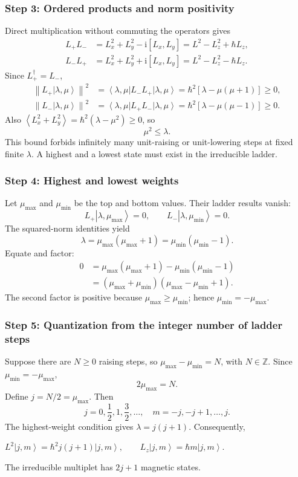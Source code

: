 \documentclass[11pt,a4paper]{article}
\newcommand{\key}[1]{\begin{resultbox}\centering\(\displaystyle #1\)\end{resultbox}}
\newcommand{\iu}{\mathrm{i}}
\newcommand{\avg}[1]{\left\langle #1\right\rangle}
\newcommand{\ket}[1]{\left|#1\right\rangle}
\newcommand{\bra}[1]{\left\langle #1\right|}
\newcommand{\norm}[1]{\left\lVert #1\right\rVert}
\begin{document}
\subsubsection*{Step 3: Ordered products and norm positivity}
Direct multiplication without commuting the operators gives
\begin{align}
L_+L_-&=L_x^2+L_y^2-\iu[L_x,L_y]=L^2-L_z^2+\hbar L_z,\\
L_-L_+&=L_x^2+L_y^2+\iu[L_x,L_y]=L^2-L_z^2-\hbar L_z.
\end{align}
Since \(L_+^\dagger=L_-\),
\begin{align}
\norm{L_+\ket{\lambda,\mu}}^2&=\bra{\lambda,\mu}L_-L_+\ket{\lambda,\mu}=\hbar^2[\lambda-\mu(\mu+1)]\ge0,\\
\norm{L_-\ket{\lambda,\mu}}^2&=\bra{\lambda,\mu}L_+L_-\ket{\lambda,\mu}=\hbar^2[\lambda-\mu(\mu-1)]\ge0.
\end{align}
Also \(\avg{L_x^2+L_y^2}=\hbar^2(\lambda-\mu^2)\ge0\), so
\begin{equation}\boxed{\mu^2\le\lambda.}\end{equation}
This bound forbids infinitely many unit-raising or unit-lowering steps at fixed finite \(\lambda\). A highest and a lowest state must exist in the irreducible ladder.

\subsubsection*{Step 4: Highest and lowest weights}
Let \(\mu_{\max}\) and \(\mu_{\min}\) be the top and bottom values. Their ladder results vanish:
\begin{equation}L_+\ket{\lambda,\mu_{\max}}=0,\qquad L_-\ket{\lambda,\mu_{\min}}=0.\end{equation}
The squared-norm identities yield
\begin{equation}\boxed{\lambda=\mu_{\max}(\mu_{\max}+1)=\mu_{\min}(\mu_{\min}-1).}\end{equation}
Equate and factor:
\begin{align}
0&=\mu_{\max}(\mu_{\max}+1)-\mu_{\min}(\mu_{\min}-1)\\
&=(\mu_{\max}+\mu_{\min})(\mu_{\max}-\mu_{\min}+1).
\end{align}
The second factor is positive because \(\mu_{\max}\ge\mu_{\min}\); hence \(\mu_{\min}=-\mu_{\max}\).

\subsubsection*{Step 5: Quantization from the integer number of ladder steps}
Suppose there are \(N\ge0\) raising steps, so \(\mu_{\max}-\mu_{\min}=N\), with \(N\in\mathbb Z\). Since \(\mu_{\min}=-\mu_{\max}\),
\begin{equation}2\mu_{\max}=N.\end{equation}
Define \(j=N/2=\mu_{\max}\). Then
\begin{equation}\boxed{j=0,\frac12,1,\frac32,\ldots,\quad m=-j,-j+1,\ldots,j.}\end{equation}
The highest-weight condition gives \(\lambda=j(j+1)\). Consequently,
\key{\boxed{L^2\ket{j,m}=\hbar^2j(j+1)\ket{j,m},\qquad L_z\ket{j,m}=\hbar m\ket{j,m}.}}
The irreducible multiplet has \(2j+1\) magnetic states.
\end{document}
